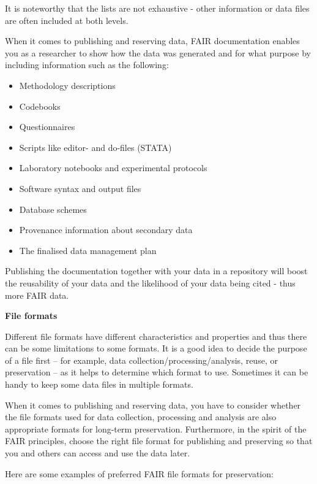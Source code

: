 \documentclass[
]{book}
\providecommand{\tightlist}{%
  \setlength{\itemsep}{0pt}\setlength{\parskip}{0pt}}
\begin{document}
It is noteworthy that the lists are not exhaustive - other information or data files are often included at both levels.

When it comes to publishing and reserving data, FAIR documentation enables you as a researcher to show how the data was generated and for what purpose by including information such as the following:

\begin{itemize}
\tightlist
\item
  Methodology descriptions
\item
  Codebooks
\item
  Questionnaires
\item
  Scripts like editor- and do-files (STATA)
\item
  Laboratory notebooks and experimental protocols
\item
  Software syntax and output files
\item
  Database schemes
\item
  Provenance information about secondary data
\item
  The finalised data management plan
\end{itemize}

Publishing the documentation together with your data in a repository will boost the reusability of your data and the likelihood of your data being cited - thus more FAIR data.

\textbf{File formats}

Different file formats have different characteristics and properties and thus there can be some limitations to some formats. It is a good idea to decide the purpose of a file first -- for example, data collection/processing/analysis, reuse, or preservation -- as it helps to determine which format to use. Sometimes it can be handy to keep some data files in multiple formats.

When it comes to publishing and reserving data, you have to consider whether the file formats used for data collection, processing and analysis are also appropriate formats for long-term preservation. Furthermore, in the spirit of the FAIR principles, choose the right file format for publishing and preserving so that you and others can access and use the data later.

Here are some examples of preferred FAIR file formats for preservation:
\end{document}
